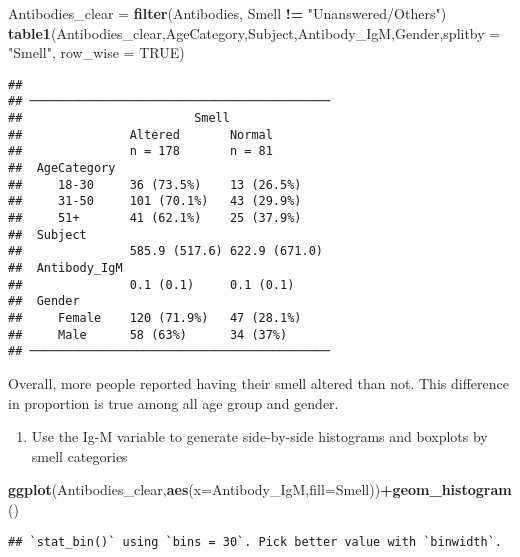 \documentclass[]{article}
\newenvironment{Shaded}{\begin{snugshade}}{\end{snugshade}}
\newcommand{\DataTypeTok}[1]{\textcolor[rgb]{0.13,0.29,0.53}{#1}}
\newcommand{\KeywordTok}[1]{\textcolor[rgb]{0.13,0.29,0.53}{\textbf{#1}}}
\newcommand{\NormalTok}[1]{#1}
\newcommand{\OperatorTok}[1]{\textcolor[rgb]{0.81,0.36,0.00}{\textbf{#1}}}
\newcommand{\OtherTok}[1]{\textcolor[rgb]{0.56,0.35,0.01}{#1}}
\newcommand{\StringTok}[1]{\textcolor[rgb]{0.31,0.60,0.02}{#1}}
\providecommand{\tightlist}{%
  \setlength{\itemsep}{0pt}\setlength{\parskip}{0pt}}
\begin{document}
\begin{Shaded}
\begin{Highlighting}[]
\NormalTok{Antibodies_clear =}\StringTok{ }\KeywordTok{filter}\NormalTok{(Antibodies, Smell }\OperatorTok{!=}\StringTok{ "Unanswered/Others"}\NormalTok{)}
\KeywordTok{table1}\NormalTok{(Antibodies_clear,AgeCategory,Subject,Antibody_IgM,Gender,}\DataTypeTok{splitby =} \StringTok{"Smell"}\NormalTok{,   }\DataTypeTok{row_wise =} \OtherTok{TRUE}\NormalTok{)}
\end{Highlighting}
\end{Shaded}

\begin{verbatim}
## 
## ──────────────────────────────────────────
##                        Smell 
##               Altered       Normal       
##               n = 178       n = 81       
##  AgeCategory                             
##     18-30     36 (73.5%)    13 (26.5%)   
##     31-50     101 (70.1%)   43 (29.9%)   
##     51+       41 (62.1%)    25 (37.9%)   
##  Subject                                 
##               585.9 (517.6) 622.9 (671.0)
##  Antibody_IgM                            
##               0.1 (0.1)     0.1 (0.1)    
##  Gender                                  
##     Female    120 (71.9%)   47 (28.1%)   
##     Male      58 (63%)      34 (37%)     
## ──────────────────────────────────────────
\end{verbatim}

Overall, more people reported having their smell altered than not. This
difference in proportion is true among all age group and gender.

\begin{enumerate}
\def\labelenumi{\alph{enumi})}
\setcounter{enumi}{1}
\tightlist
\item
  Use the Ig-M variable to generate side-by-side histograms and boxplots
  by smell categories
\end{enumerate}

\begin{Shaded}
\begin{Highlighting}[]
\KeywordTok{ggplot}\NormalTok{(Antibodies_clear,}\KeywordTok{aes}\NormalTok{(}\DataTypeTok{x=}\NormalTok{Antibody_IgM,}\DataTypeTok{fill=}\NormalTok{Smell))}\OperatorTok{+}\KeywordTok{geom_histogram}\NormalTok{()}
\end{Highlighting}
\end{Shaded}

\begin{verbatim}
## `stat_bin()` using `bins = 30`. Pick better value with `binwidth`.
\end{verbatim}
\end{document}
